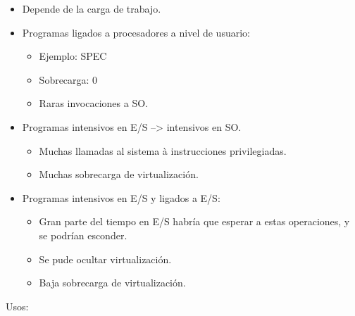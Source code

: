 \documentclass[12pt, twoside, openright]{report} %
\begin{document}
    \begin{itemize}
    
    \item
      Depende de la carga de trabajo.
    \item
      Programas ligados a procesadores a nivel de usuario:

      \begin{itemize}
      
      \item
        Ejemplo: SPEC
      \item
        Sobrecarga: 0
      \item
        Raras invocaciones a SO.
      \end{itemize}
    \item
      Programas intensivos en E/S --\textgreater{} intensivos en SO.

      \begin{itemize}
      
      \item
        Muchas llamadas al sistema à instrucciones privilegiadas.
      \item
        Muchas sobrecarga de virtualización.
      \end{itemize}
    \item
      Programas intensivos en E/S y ligados a E/S:

      \begin{itemize}
      
      \item
        Gran parte del tiempo en E/S habría que esperar a estas
        operaciones, y se podrían esconder.
      \item
        Se pude ocultar virtualización.
      \item
        Baja sobrecarga de virtualización.
      \end{itemize}
    \end{itemize}

    Usos:
\end{document}
